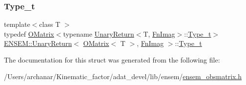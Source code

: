 \subsubsection{\texorpdfstring{Type\_t}{Type\_t}\hspace{0.1cm}{\footnotesize\ttfamily [2/2]}}
{\footnotesize\ttfamily template$<$class T $>$ \\
typedef \mbox{\hyperlink{classENSEM_1_1OMatrix}{O\+Matrix}}$<$typename \mbox{\hyperlink{structENSEM_1_1UnaryReturn}{Unary\+Return}}$<$T, \mbox{\hyperlink{structENSEM_1_1FnImag}{Fn\+Imag}}$>$\+::\mbox{\hyperlink{structENSEM_1_1UnaryReturn_3_01OMatrix_3_01T_01_4_00_01FnImag_01_4_a0841f7311ee5495c55d754fd855f045c}{Type\+\_\+t}}$>$ \mbox{\hyperlink{structENSEM_1_1UnaryReturn}{E\+N\+S\+E\+M\+::\+Unary\+Return}}$<$ \mbox{\hyperlink{classENSEM_1_1OMatrix}{O\+Matrix}}$<$ T $>$, \mbox{\hyperlink{structENSEM_1_1FnImag}{Fn\+Imag}} $>$\+::\mbox{\hyperlink{structENSEM_1_1UnaryReturn_3_01OMatrix_3_01T_01_4_00_01FnImag_01_4_a0841f7311ee5495c55d754fd855f045c}{Type\+\_\+t}}}



The documentation for this struct was generated from the following file\+:\begin{DoxyCompactItemize}
\item 
/\+Users/archanar/\+Kinematic\+\_\+factor/adat\+\_\+devel/lib/ensem/\mbox{\hyperlink{lib_2ensem_2ensem__obsmatrix_8h}{ensem\+\_\+obsmatrix.\+h}}\end{DoxyCompactItemize}
